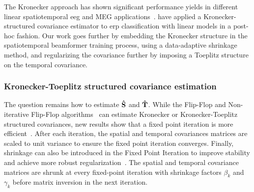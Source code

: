 	The Kronecker approach has shown significant performance yields in different linear spatiotemporal \ac{eeg} and MEG
	applications~\cite{DeMunck2002,Huizenga2002,Beltrachini2013,GonzalezNavarro2016,GonzalezNavarro2017}.
	\textcite{Vliet2020} have applied a Kronecker-structured covariance estimator to \ac{erp} classification with linear models in a post-hoc fashion.
	Our work goes further by embedding the Kronecker structure in the
	spatiotemporal beamformer training process, using a data-adaptive shrinkage
	method, and regularizing the covariance further by imposing a Toeplitz
	structure on the temporal covariance.

	\subsubsection{Kronecker-Toeplitz structured covariance estimation}
	\label{sec:stbf-struct/methods/struct-cov}
  The question remains how to estimate $\mathbf{\hat{S}}$ and $\mathbf{\hat{T}}$.
	While the Flip-Flop and Non-iterative Flip-Flop
	algorithms~\cite{Lu2005, Werner2008, Wirfaelt2010} can estimate Kronecker or Kronecker-Toeplitz structured covariances, new results show that a fixed point iteration is more efficient~\cite{Wiesel2012a,Wiesel2012}.
	After each iteration, the spatial and temporal covariances matrices are scaled to unit
	variance to ensure the fixed point iteration converges.
	Finally, shrinkage can also be introduced in the Fixed Point Iteration to
	improve stability and achieve more robust
	regularization~\cite{Wiesel2012,Greenewald2014,Beltrachini2013, Breloy2016}.
	The spatial and temporal covariance matrices are shrunk at every fixed-point
	iteration with shrinkage factors $\beta_k$ and $\gamma_k$ before matrix
	inversion in the
	next iteration.


